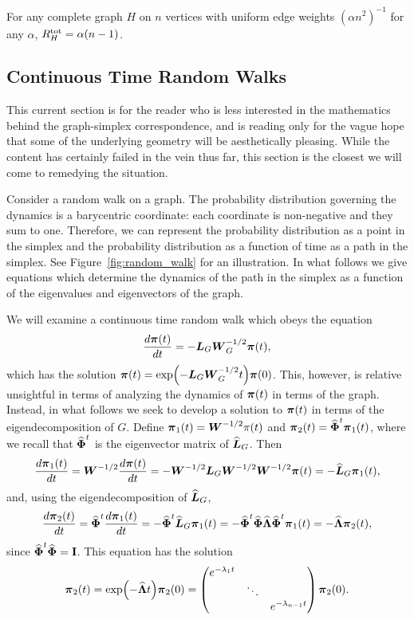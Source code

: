 \begin{lemma}
	For any complete graph $H$ on $n$ vertices with uniform edge weights  $(\alpha n^2)^{-1}$ for any $\alpha$,  $R^{\textnormal{tot}}_H = \alpha (n-1)$. 
\end{lemma}

\subsection{Continuous Time Random Walks}
\label{sec:random_walks}
This current section is for the reader who is less interested  in the  mathematics  behind the graph-simplex correspondence, and is reading only for the vague  hope  that some of the underlying geometry will be aesthetically pleasing. While  the  content has certainly failed in the vein thus far, this section  is the closest we will come to remedying the situation. 

Consider a  random walk on a graph. The probability distribution  governing the dynamics is a barycentric  coordinate: each coordinate is non-negative and they sum to one. Therefore, we can represent the probability distribution as a point in the simplex and the probability  distribution as a function of time as a path in the simplex. See Figure~\ref{fig:random_walk} for an illustration. In what follows we give equations which determine the dynamics of the path in the simplex as a function of the eigenvalues  and eigenvectors  of the graph. 

We will examine a continuous time random walk which  obeys the equation 
\begin{equation*}
\frac{d \boldsymbol{\pi}(t)}{dt } = -\vb*{L}_G\vb*{W}_G^{-1/2} \boldsymbol{\pi}(t),
\end{equation*}
which has the solution $\boldsymbol{\pi}(t)  = \exp(-\vb*{L}_G\vb*{W}_G^{-1/2}t)\boldsymbol{\pi}(0)$. This, however, is relative unsightful in terms of  analyzing the dynamics of $\boldsymbol{\pi}(t)$ in terms of the  graph.  Instead, in  what follows we seek  to develop a solution to $\boldsymbol{\pi}(t)$ in terms of the  eigendecomposition of  $G$.  Define $\boldsymbol{\pi}_1(t) = \vb*{W}^{-1/2}\pi(t)$ and $\boldsymbol{\pi}_2(t) = \widehat{\boldsymbol{\Phi}}^t \boldsymbol{\pi}_1(t)$, where we recall that $\widehat{\boldsymbol{\Phi}}^t$ is the eigenvector matrix  of  $\widehat{\vb*{L}}_G$.  Then 
\begin{equation*}
\frac{d \boldsymbol{\pi}_1(t)}{dt} = \vb*{W}^{-1/2}\frac{d \boldsymbol{\pi}(t)}{dt} = -\vb*{W}^{-1/2}\vb*{L}_G\vb*{W}^{-1/2}\vb*{W}^{-1/2}\boldsymbol{\pi}(t) = - \widehat{\vb*{L}}_G\boldsymbol{\pi}_1(t),
\end{equation*}
and, using the eigendecomposition of $\widehat{\vb*{L}}_G$,   
\begin{equation*}
\frac{ d\boldsymbol{\pi}_2(t)}{dt} = \widehat{\boldsymbol{\Phi}}^t \frac{d\boldsymbol{\pi}_1(t)}{dt} = -\widehat{\boldsymbol{\Phi}}^t \widehat{\vb*{L}}_G \boldsymbol{\pi}_1(t) = -\widehat{\boldsymbol{\Phi}}^t \widehat{\boldsymbol{\Phi}}\widehat{\vb{\Lambda}}\widehat{\boldsymbol{\Phi}}^t \boldsymbol{\pi}_1(t) = -\widehat{\vb{\Lambda}}  \boldsymbol{\pi}_2(t),
\end{equation*}
since  $\widehat{\boldsymbol{\Phi}}^t\widehat{\boldsymbol{\Phi}}=\vb{I}$. This equation  has the solution 
\begin{equation*}
\boldsymbol{\pi}_2(t) = \exp(-\widehat{\vb{\Lambda}} t)\boldsymbol{\pi}_2(0) = \begin{pmatrix}
e^{-\lambda_1 t}  & &\\
& \ddots  & \\
&& e^{-\lambda_{n-1} t}
\end{pmatrix}  \boldsymbol{\pi}_2(0).
\end{equation*}

